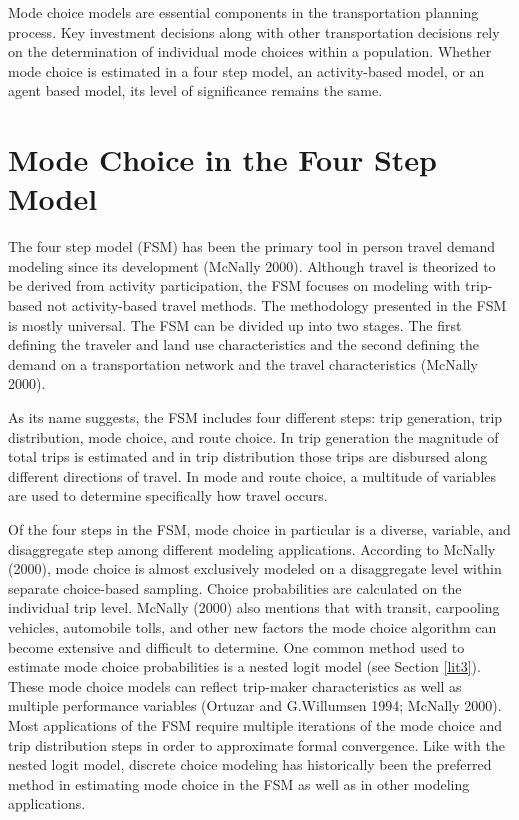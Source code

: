 \documentclass[12pt, oneside, openright]{byuthesis}
\begin{document}
Mode choice models are essential components in the transportation planning process. Key investment decisions along with other transportation decisions rely on the determination of individual mode choices within a population. Whether mode choice is estimated in a four step model, an activity-based model, or an agent based model, its level of significance remains the same.

\hypertarget{lit1}{%
\section{Mode Choice in the Four Step Model}\label{lit1}}

The four step model (FSM) has been the primary tool in person travel demand modeling since its development (McNally 2000). Although travel is theorized to be derived from activity participation, the FSM focuses on modeling with trip-based not activity-based travel methods. The methodology presented in the FSM is mostly universal. The FSM can be divided up into two stages. The first defining the traveler and land use characteristics and the second defining the demand on a transportation network and the travel characteristics (McNally 2000).

As its name suggests, the FSM includes four different steps: trip generation, trip distribution, mode choice, and route choice. In trip generation the magnitude of total trips is estimated and in trip distribution those trips are disbursed along different directions of travel. In mode and route choice, a multitude of variables are used to determine specifically how travel occurs.

Of the four steps in the FSM, mode choice in particular is a diverse, variable, and disaggregate step among different modeling applications. According to McNally (2000), mode choice is almost exclusively modeled on a disaggregate level within separate choice-based sampling. Choice probabilities are calculated on the individual trip level. McNally (2000) also mentions that with transit, carpooling vehicles, automobile tolls, and other new factors the mode choice algorithm can become extensive and difficult to determine. One common method used to estimate mode choice probabilities is a nested logit model (see Section \ref{lit3}). These mode choice models can reflect trip-maker characteristics as well as multiple performance variables (Ortuzar and G.Willumsen 1994; McNally 2000). Most applications of the FSM require multiple iterations of the mode choice and trip distribution steps in order to approximate formal convergence. Like with the nested logit model, discrete choice modeling has historically been the preferred method in estimating mode choice in the FSM as well as in other modeling applications.
\end{document}
